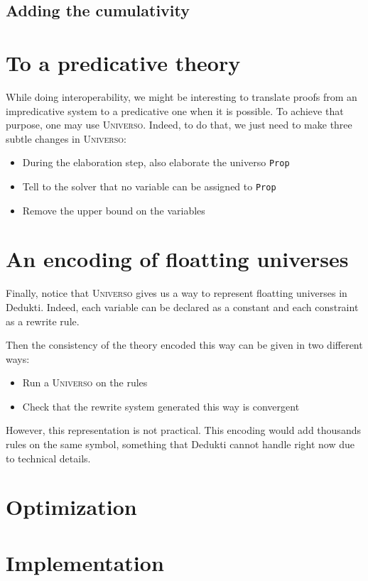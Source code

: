 \documentclass[conference]{IEEEtran}
\newcommand{\universo}{\textsc{Universo}}
\begin{document}
\subsection{Adding the cumulativity}

\section{To a predicative theory}

While doing interoperability, we might be interesting to translate proofs from an impredicative system to a predicative one when it is possible. To achieve that purpose, one may use \universo. Indeed, to do that, we just need to make three subtle changes in \universo:
\begin{itemize}
\item During the elaboration step, also elaborate the universo \texttt{Prop}
\item Tell to the solver that no variable can be assigned to \texttt{Prop}
\item Remove the upper bound on the variables
\end{itemize}

\section{An encoding of floatting universes}

Finally, notice that \universo{} gives us a way to represent floatting universes in Dedukti. Indeed, each variable can be declared as a constant and each constraint as a rewrite rule.

Then the consistency of the theory encoded this way can be given in two different ways:

\begin{itemize}
\item Run a \universo{} on the rules
\item Check that the rewrite system generated this way is convergent
\end{itemize}

However, this representation is not practical. This encoding would add thousands rules on the same symbol, something that Dedukti cannot handle right now due to technical details.

\section{Optimization}

\section{Implementation}
\end{document}
